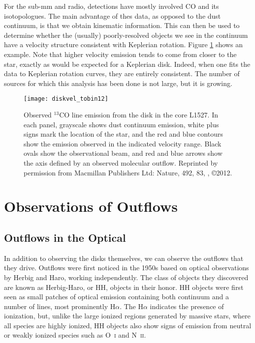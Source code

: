 For the sub-mm and radio, detections have mostly involved CO and its isotopologues. The main advantage of thes data, as opposed to the dust continuum, is that we obtain kinematic information. This can then be used to determine whether the (usually) poorly-resolved objects we see in the continuum have a velocity structure consistent with Keplerian rotation.  Figure \ref{fig:diskvel_tobin12} shows an example. Note that higher velocity emission tends to come from closer to the star, exactly as would be expected for a Keplerian disk. Indeed, when one fits the data to Keplerian rotation curves, they are entirely consistent. The number of sources for which this analysis has been done is not large, but it is growing.

\begin{figure}
\texttt{[image: diskvel\_tobin12]}
\caption[$^{13}$CO channel maps of the disk in L1527]{
\label{fig:diskvel_tobin12}
Observed $^{13}$CO line emission from the disk in the core L1527. In each panel, grayscale shows dust continuum emission, white plus signs mark the location of the star, and the red and blue contours show the emission observed in the indicated velocity range. Black ovals show the observational beam, and red and blue arrows show the axis defined by an observed molecular outflow. Reprinted by permission from Macmillan Publishers Ltd: Nature, 492, 83, \citeauthor{tobin12a}, \copyright 2012.
}
\end{figure}



\section{Observations of Outflows}

\subsection{Outflows in the Optical}

In addition to observing the disks themselves, we can observe the outflows that they drive. Outflows were first noticed in the 1950s based on optical observations by Herbig and Haro, working independently. The class of objects they discovered are known as Herbig-Haro, or HH, objects in their honor. HH objects were first seen as small patches of optical emission containing both continuum and a number of lines, most prominently H$\alpha$. The H$\alpha$ indicates the presence of ionization, but, unlike the large ionized regions generated by massive stars, where all species are highly ionized, HH objects also show signs of emission from neutral or weakly ionized species such as O~\textsc{i} and N~\textsc{ii}.

